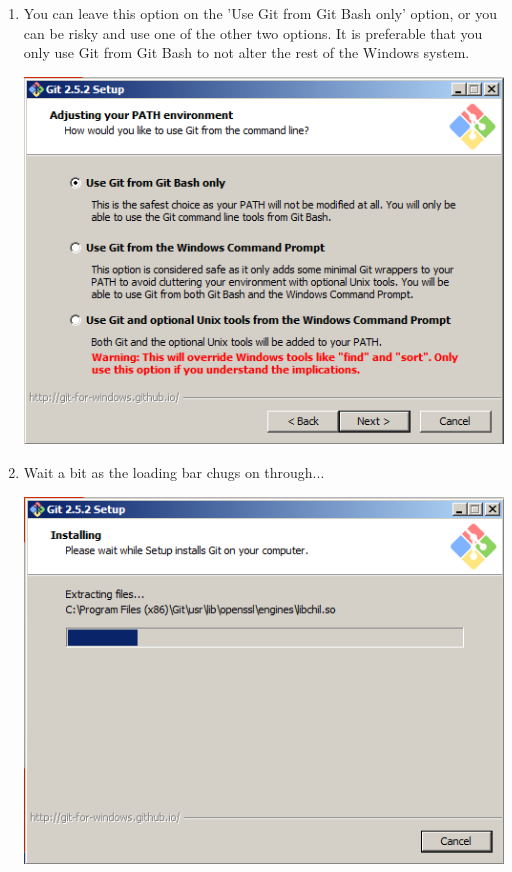 \documentclass[11pt,fleqn]{article}
\theoremstyle{definition}
\begin{document}
\begin{enumerate}[Step 1.]
\item You can leave this option on the 'Use Git from Git Bash only' option, or you can be risky and use one of the other two options. It is preferable that you only use Git from Git Bash to not alter the rest of the Windows system.
\begin{center}
\includegraphics[scale=0.6]{gitwininstall9.png}
\end{center}

\newpage
\item Wait a bit as the loading bar chugs on through...
\begin{center}
\includegraphics[scale=0.6]{gitwininstall10.png}
\end{center}


\end{enumerate}
\end{document}
